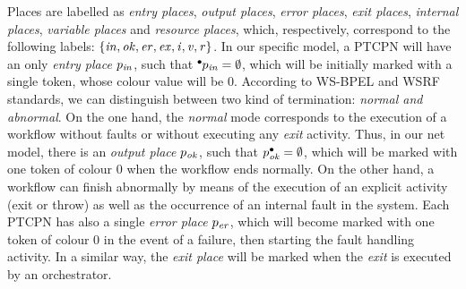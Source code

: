 \begin{definition}
\begin{itemize}
Places are labelled as
{\em entry places}, {\em output places}, {\em error places}, {\em exit places}, 
{\em internal places}, {\em variable places} and
{\em resource places},
which, respectively, correspond to the following labels:
$\{{\it in, ok, er, ex, i, v, r}\}$. In our specific model, a 
PTCPN will have an only {\em entry place} $p_{\it in}$, 
such that $\hspace*{-0.4em}~^{\bullet} \hspace*{-0.05em}p_{\it in} = \emptyset$,
which will be
initially marked with a single token, whose colour value will be $0$.
According to WS-BPEL and WSRF standards,
we can distinguish between two kind of termination: \emph{normal and abnormal}. On the one hand, the \emph{normal} mode
corresponds to the execution of a workflow without faults or without executing any \emph{exit} activity. Thus, in our net model, there is 
an {\em output place} $p_{\it ok}$, such that
$p^{\bullet}_{\it ok}=\emptyset$, which will be marked with 
one token of colour $0$ when the workflow ends normally. On the other hand, a workflow can finish abnormally by means of the execution of an explicit activity (exit or throw) as well as
the occurrence of an internal fault in the system. Each PTCPN has also a single {\em error place} $p_{\it er}$, 
which will become marked
with one token of colour $0$ in the event of a failure, then starting the fault handling activity.
In a similar way, the {\em exit place} will be marked when the {\em exit} is executed by an
orchestrator.%


\end{itemize}
\end{definition}
